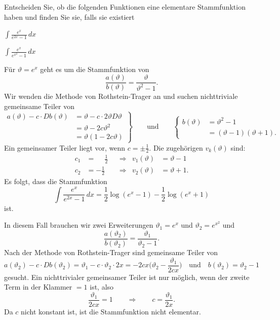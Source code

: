 Entscheiden Sie, ob die folgenden Funktionen eine elementare Stammfunktion
haben und finden Sie sie, falls sie existiert
\begin{teilaufgaben}
\item
$\displaystyle \int \frac{e^x}{e^{2x}-1}\,dx$
\item
$\displaystyle \int \frac{e^x}{e^{x^2}-1}\,dx$
\end{teilaufgaben}

\begin{loesung}
\begin{teilaufgaben}
\item
Für $\vartheta=e^x$ geht es um die Stammfunktion von
\[
\frac{a(\vartheta)}{b(\vartheta)}
=
\frac{\vartheta}{\vartheta^2-1}.
\]
Wir wenden die Methode von Rothstein-Trager an und suchen nichttriviale
gemeinsame Teiler von
\[
\left.
\begin{aligned}
a(\vartheta) - c\cdot Db(\vartheta)
&=
\vartheta - c\cdot 2\vartheta D\vartheta
\\
&=
\vartheta - 2c\vartheta^2
\\
&=
\vartheta(1-2c\vartheta)
\end{aligned}
\right\}
\qquad\text{und}\qquad
\left\{
\begin{aligned}
b(\vartheta) &= \vartheta^2-1
\\
&=
(\vartheta-1)(\vartheta+1).
\end{aligned}
\right.
\]
Ein gemeinsamer Teiler liegt vor, wenn $c=\pm \frac12$.
Die zugehörigen $v_k(\vartheta)$ sind:
\[
\begin{aligned}
c_1&=\phantom{-}\frac12 &&\Rightarrow& v_1(\vartheta) &= \vartheta-1\\
c_2&=-\frac12           &&\Rightarrow& v_2(\vartheta) &= \vartheta+1.
\end{aligned}
\]
Es folgt, dass die Stammfunktion
\[
\int \frac{e^x}{e^{2x}-1}\,dx
=
\frac12\log(e^x-1) -\frac12\log(e^x+1)
\]
ist.
\item
In diesem Fall brauchen wir zwei Erweiterungen $\vartheta_1=e^x$ und
$\vartheta_2=e^{x^2}$ und
\[
\frac{a(\vartheta_2)}{b(\vartheta_2)}
=
\frac{\vartheta_1}{\vartheta_2-1}.
\]
Nach der Methode von Rothstein-Trager sind gemeinsame Teiler von
\[
a(\vartheta_2)-c\cdot Db(\vartheta_2)
=
\vartheta_1 - c\cdot \vartheta_2\cdot 2x
=
-2cx \biggl(\vartheta_2 - \frac{\vartheta_1}{2cx}\biggr)
\quad\text{und}\quad
b(\vartheta_2) = \vartheta_2-1
\]
gesucht.
Ein nichttrivialer gemeinsamer Teiler ist nur möglich, wenn der zweite
Term in der Klammer $=1$ ist, also
\[
\frac{\vartheta_1}{2cx}=1
\qquad\Rightarrow\qquad
c=\frac{\vartheta_1}{2x}.
\]
Da $c$ nicht konstant ist, ist die Stammfunktion nicht elementar.
\qedhere
\end{teilaufgaben}
\end{loesung}

